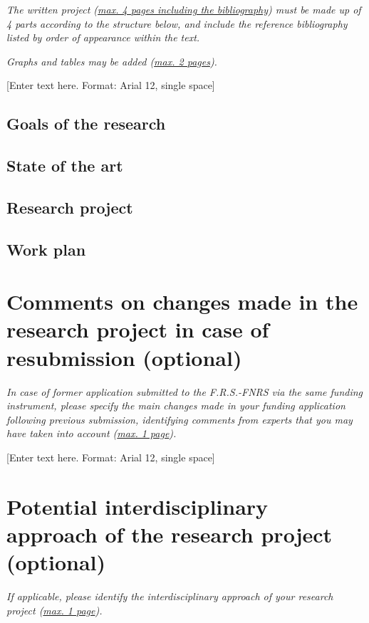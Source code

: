 \documentclass{fnrscq}
\begin{document}
\textit{\footnotesize The written project (\uline{max. 4 pages including the bibliography})
  must be made up of 4 parts according to the structure below, and include the reference
  bibliography listed by order of appearance within the text.}

\textit{\footnotesize Graphs and tables may be added (\uline{max. 2 pages}).}

[Enter text here. Format: Arial 12, single space]

\subsection{Goals of the research}

\subsection{State of the art}

\subsection{Research project}

\subsection{Work plan}


\section{Comments on changes made in the research project in case of
  resubmission (optional)}

\textit{\footnotesize In case of former application submitted to the F.R.S.-FNRS via the
  same funding instrument, please specify the main changes made in your funding application
  following previous submission, identifying comments from experts that you may have taken
  into account (\uline{max. 1 page}).}

[Enter text here. Format: Arial 12, single space]

\section{Potential interdisciplinary approach of the research project\\ (optional)}

\textit{\footnotesize If applicable, please identify the interdisciplinary approach of your
  research project (\uline{max. 1 page}).}
\end{document}
